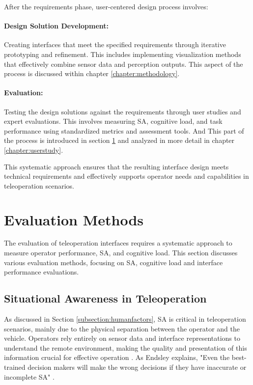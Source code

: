 After the requirements phase, user-centered design process involves:

\paragraph{Design Solution Development:} Creating interfaces that meet the specified requirements through iterative prototyping and refinement. This includes implementing visualization methods that effectively combine sensor data and perception outputs.
This aspect of the process is discussed within chapter \ref{chapter:methodology}.
\paragraph{Evaluation:} Testing the design solutions against the requirements through user studies and expert evaluations. This involves measuring \ac{SA}, cognitive load, and task performance using standardized metrics and assessment tools. And This part of the process is introduced in section \ref{section:evaluationmethods} and analyzed in more detail in chapter \ref{chapter:userstudy}.

This systematic approach ensures that the resulting interface design meets technical requirements and effectively supports operator needs and capabilities in teleoperation scenarios.


\section{Evaluation Methods}\label{section:evaluationmethods}
The evaluation of teleoperation interfaces requires a systematic approach to measure operator performance, \ac{SA}, and cognitive load. This section discusses various evaluation methods, focusing on \ac{SA}, cognitive load and interface performance evaluations.
\subsection{Situational Awareness in Teleoperation}\label{subsection:situationawareness}
As discussed in Section \ref{subsection:humanfactors}, \ac{SA} is critical in teleoperation scenarios, mainly due to the physical separation between the operator and the vehicle. Operators rely entirely on sensor data and interface representations to understand the remote environment, making the quality and presentation of this information crucial for effective operation \cite{Gnatzig}. As Endsley explains, "Even the best-trained decision makers will make the wrong decisions if they have inaccurate or incomplete SA" \cite{endsley1995toward}.

